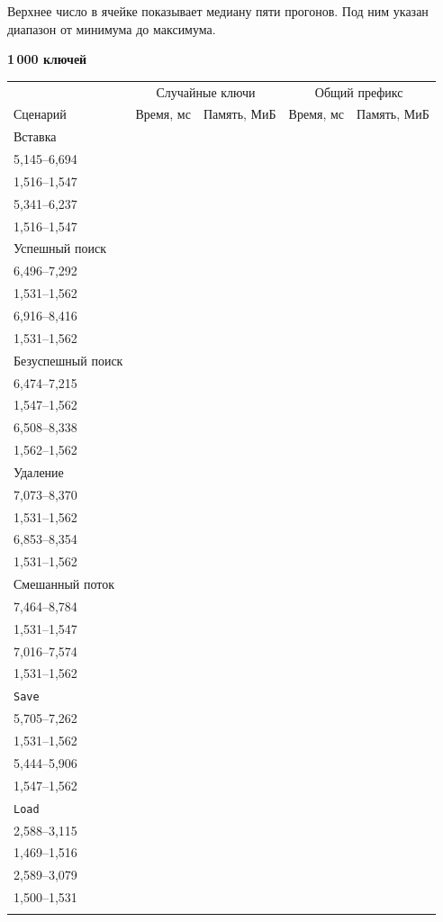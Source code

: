 Верхнее число в ячейке показывает медиану пяти прогонов. Под ним указан диапазон от минимума до максимума.
\begingroup
\newcommand{\BenchValue}[3]{\shortstack[r]{#1\\{\scriptsize #2--#3}}}
\newcommand{\BenchTable}[2]{%
  \par\medskip\noindent
  \begin{minipage}{\linewidth}
    \textbf{#1}\par\smallskip
    \small
    \renewcommand{\arraystretch}{1.12}%
    \begin{tabular*}{\linewidth}{@{\extracolsep{\fill}}lrrrr@{}}
      \hline
      & \multicolumn{2}{c}{Случайные ключи} & \multicolumn{2}{c}{Общий префикс} \\
      Сценарий & Время, мс & Память, МиБ & Время, мс & Память, МиБ \\
      \hline
      \noalign{\vskip 3pt}
      #2
      \noalign{\vskip 2pt}
      \hline
    \end{tabular*}
  \end{minipage}\par
}

\BenchTable{1\,000 ключей}{
  Вставка & \BenchValue{6,356}{5,145}{6,694} & \BenchValue{1,531}{1,516}{1,547} & \BenchValue{5,638}{5,341}{6,237} & \BenchValue{1,516}{1,516}{1,547} \\
  Успешный поиск & \BenchValue{6,795}{6,496}{7,292} & \BenchValue{1,562}{1,531}{1,562} & \BenchValue{8,054}{6,916}{8,416} & \BenchValue{1,547}{1,531}{1,562} \\
  Безуспешный поиск & \BenchValue{6,908}{6,474}{7,215} & \BenchValue{1,562}{1,547}{1,562} & \BenchValue{6,930}{6,508}{8,338} & \BenchValue{1,562}{1,562}{1,562} \\
  Удаление & \BenchValue{7,171}{7,073}{8,370} & \BenchValue{1,531}{1,531}{1,562} & \BenchValue{6,998}{6,853}{8,354} & \BenchValue{1,547}{1,531}{1,562} \\
  Смешанный поток & \BenchValue{7,719}{7,464}{8,784} & \BenchValue{1,547}{1,531}{1,547} & \BenchValue{7,434}{7,016}{7,574} & \BenchValue{1,547}{1,531}{1,562} \\
  \texttt{Save} & \BenchValue{5,866}{5,705}{7,262} & \BenchValue{1,547}{1,531}{1,562} & \BenchValue{5,772}{5,444}{5,906} & \BenchValue{1,562}{1,547}{1,562} \\
  \texttt{Load} & \BenchValue{2,791}{2,588}{3,115} & \BenchValue{1,500}{1,469}{1,516} & \BenchValue{2,690}{2,589}{3,079} & \BenchValue{1,500}{1,500}{1,531} \\
}

